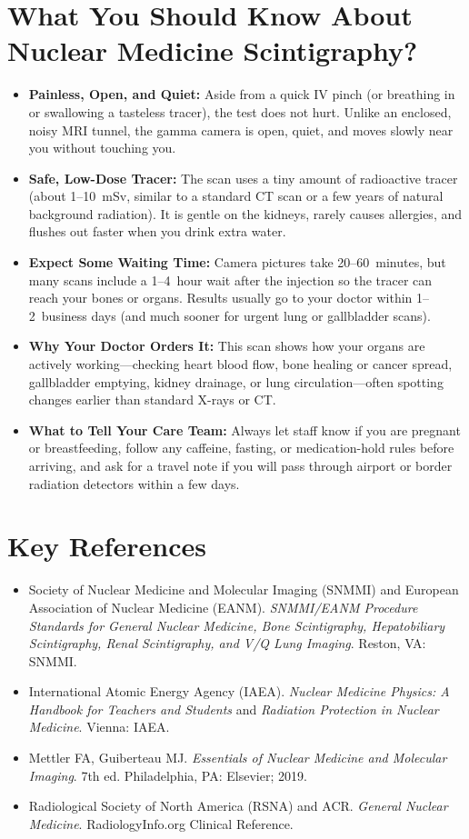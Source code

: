 \section{What You Should Know About Nuclear Medicine Scintigraphy?}
\begin{itemize}
\item \textbf{Painless, Open, and Quiet:} Aside from a quick IV pinch (or breathing in or swallowing a tasteless tracer), the test does not hurt. Unlike an enclosed, noisy MRI tunnel, the gamma camera is open, quiet, and moves slowly near you without touching you.
\item \textbf{Safe, Low-Dose Tracer:} The scan uses a tiny amount of radioactive tracer (about 1--10~mSv, similar to a standard CT scan or a few years of natural background radiation). It is gentle on the kidneys, rarely causes allergies, and flushes out faster when you drink extra water.
\item \textbf{Expect Some Waiting Time:} Camera pictures take 20--60~minutes, but many scans include a 1--4~hour wait after the injection so the tracer can reach your bones or organs. Results usually go to your doctor within 1--2~business days (and much sooner for urgent lung or gallbladder scans).
\item \textbf{Why Your Doctor Orders It:} This scan shows how your organs are actively working---checking heart blood flow, bone healing or cancer spread, gallbladder emptying, kidney drainage, or lung circulation---often spotting changes earlier than standard X-rays or CT.
\item \textbf{What to Tell Your Care Team:} Always let staff know if you are pregnant or breastfeeding, follow any caffeine, fasting, or medication-hold rules before arriving, and ask for a travel note if you will pass through airport or border radiation detectors within a few days.
\end{itemize}

\section{Key References}
\begin{itemize}
\item Society of Nuclear Medicine and Molecular Imaging (SNMMI) and European Association of Nuclear Medicine (EANM). \textit{SNMMI/EANM Procedure Standards for General Nuclear Medicine, Bone Scintigraphy, Hepatobiliary Scintigraphy, Renal Scintigraphy, and V/Q Lung Imaging}. Reston, VA: SNMMI.
\item International Atomic Energy Agency (IAEA). \textit{Nuclear Medicine Physics: A Handbook for Teachers and Students} and \textit{Radiation Protection in Nuclear Medicine}. Vienna: IAEA.
\item Mettler FA, Guiberteau MJ. \textit{Essentials of Nuclear Medicine and Molecular Imaging}. 7th ed. Philadelphia, PA: Elsevier; 2019.
\item Radiological Society of North America (RSNA) and ACR. \textit{General Nuclear Medicine}. RadiologyInfo.org Clinical Reference.
\end{itemize}
